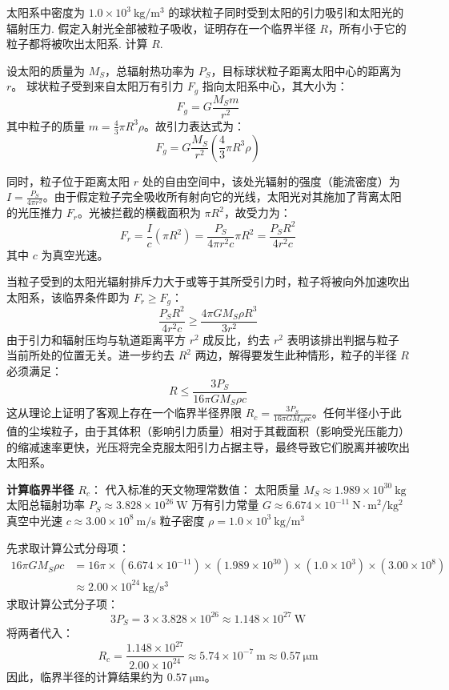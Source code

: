 \begin{exercise}\label{ex:20.8}
太阳系中密度为 $1.0 \times 10^3 \ \mathrm{kg/m^3}$ 的球状粒子同时受到太阳的引力吸引和太阳光的辐射压力. 假定入射光全部被粒子吸收，证明存在一个临界半径 $R$，所有小于它的粒子都将被吹出太阳系. 计算 $R$.
\end{exercise}
\begin{solution}
设太阳的质量为 $M_S$，总辐射热功率为 $P_S$，目标球状粒子距离太阳中心的距离为 $r$。
球状粒子受到来自太阳万有引力 $F_g$ 指向太阳系中心，其大小为：
$$ F_g = G \frac{M_S m}{r^2} $$
其中粒子的质量 $m = \frac{4}{3} \pi R^3 \rho$。故引力表达式为：
$$ F_g = G \frac{M_S}{r^2} \left( \frac{4}{3} \pi R^3 \rho \right) $$

同时，粒子位于距离太阳 $r$ 处的自由空间中，该处光辐射的强度（能流密度）为 $I = \frac{P_S}{4\pi r^2}$。由于假定粒子完全吸收所有射向它的光线，太阳光对其施加了背离太阳的光压推力 $F_r$。光被拦截的横截面积为 $\pi R^2$，故受力为：
$$ F_r = \frac{I}{c} (\pi R^2) = \frac{P_S}{4\pi r^2 c} \pi R^2 = \frac{P_S R^2}{4 r^2 c} $$
其中 $c$ 为真空光速。
        
当粒子受到的太阳光辐射排斥力大于或等于其所受引力时，粒子将被向外加速吹出太阳系，该临界条件即为 $F_r \ge F_g$：
$$ \frac{P_S R^2}{4 r^2 c} \ge \frac{4\pi G M_S \rho R^3}{3 r^2} $$
由于引力和辐射压均与轨道距离平方 $r^2$ 成反比，约去 $r^2$ 表明该排出判据与粒子当前所处的位置无关。进一步约去 $R^2$ 两边，解得要发生此种情形，粒子的半径 $R$ 必须满足：
$$ R \le \frac{3 P_S}{16\pi G M_S \rho c} $$
这从理论上证明了客观上存在一个临界半径界限 $R_c = \frac{3 P_S}{16\pi G M_S \rho c}$。任何半径小于此值的尘埃粒子，由于其体积（影响引力质量）相对于其截面积（影响受光压能力）的缩减速率更快，光压将完全克服太阳引力占据主导，最终导致它们脱离并被吹出太阳系。

\textbf{计算临界半径 $R_c$}：
代入标准的天文物理常数值：
太阳质量 $M_S \approx 1.989 \times 10^{30} \ \mathrm{kg}$
太阳总辐射功率 $P_S \approx 3.828 \times 10^{26} \ \mathrm{W}$
万有引力常量 $G \approx 6.674 \times 10^{-11} \ \mathrm{N \cdot m^2 / kg^2}$
真空中光速 $c \approx 3.00 \times 10^8 \ \mathrm{m/s}$
粒子密度 $\rho = 1.0 \times 10^3 \ \mathrm{kg/m^3}$

先求取计算公式分母项：
\begin{align*}
    16\pi G M_S \rho c &= 16 \pi \times (6.674 \times 10^{-11}) \times (1.989 \times 10^{30}) \times (1.0 \times 10^3) \times (3.00 \times 10^8) \\
    &\approx 2.00 \times 10^{24} \ \mathrm{kg/s^3}
\end{align*}
求取计算公式分子项：
$$ 3 P_S = 3 \times 3.828 \times 10^{26} \approx 1.148 \times 10^{27} \ \mathrm{W} $$
将两者代入：
$$ R_c = \frac{1.148 \times 10^{27}}{2.00 \times 10^{24}} \approx 5.74 \times 10^{-7} \ \mathrm{m} \approx 0.57 \ \mathrm{\mu m} $$
因此，临界半径的计算结果约为 $0.57 \ \mathrm{\mu m}$。
\end{solution}



